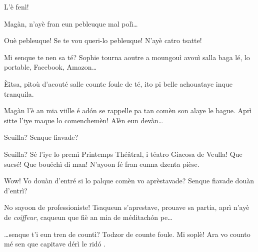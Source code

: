 \begin{drama}
\Spectateurspeaks{} L'è fenì! 





\Nevaousaspeaks Magàn, n'ayè fran eun pebleuque mal polì\ldots

\Maganspeaks Ouè pebleuque! Se te vou queri-lo pebleuque! N'ayè catro tsatte!

\Paganspeaks Mi senque te nen sa té? Sophie tourna aoutre a moungouì avouì salla baga lé, lo portable, Facebook, Amazon\ldots


\Maganspeaks \`Eitsa, pitoù d'acouté salle counte foule de té, ito pi belle achouataye inque tranquila.

\Paganspeaks{} Magàn l'è an mia viille é ad\'on se rappelle pa tan comèn son alaye le bague. Aprì sitte l'iye maque lo comenchemèn! Alèn eun devàn\ldots


\Nevaouspeaks{}  Seuilla? Senque fiavade?

\Paganspeaks Seuilla? Sé l'iye lo premì Printemps Thé\^atral, i téatro Giacosa de Veulla! Que sucsé! Que bouéchì di man! N'ayoon fé fran eunna dzenta pièse.

\Nevaousaspeaks Wow! Vo douàn d'entré si lo palque comèn vo aprèstavade? Senque fiavade douàn d'entrì?

\Paganspeaks{} No sayoon de professioniste! Tsaqueun s'aprestave, prouave sa partia, aprì n'ayè de \textit{coiffeur}, caqueun que fiè an mia de méditach\'on pe\ldots

\Maganspeaks \ldots senque t'i eun tren de countì? Todzor de counte foule. Mi soplè! Ara vo counto mé  sen que capitave dérì le rid\'o .




\end{drama}

